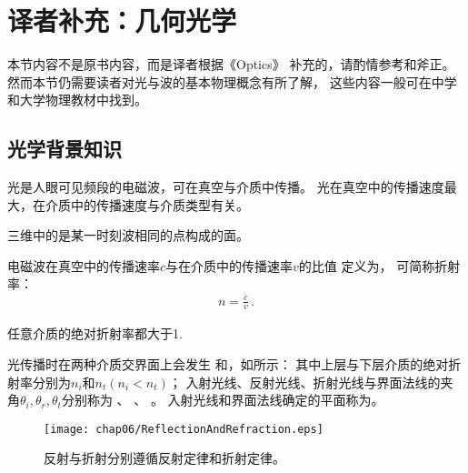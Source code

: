 \section{译者补充：几何光学}\label{sec:译者补充：几何光学}

\begin{remark}
    本节内容不是原书内容，而是译者根据《Optics》\citep{hecht2016optics}
    补充的，请酌情参考和斧正。然而本节仍需要读者对光与波的基本物理概念有所了解，
    这些内容一般可在中学和大学物理教材中找到。
\end{remark}

\subsection{光学背景知识}\label{sub:光学背景知识}
光是人眼可见频段的电磁波，可在真空与介质中传播。
光在真空中的传播速度最大，在介质中的传播速度与介质类型有关。
\begin{definition}
    三维中的是某一时刻波相同的点构成的面。
\end{definition}
\begin{definition}
    电磁波在真空中的传播速率$c$与在介质中的传播速率$v$的比值
    定义为，
    可简称折射率：
    \begin{align}
        n=\frac{c}{v}\, .
    \end{align}
\end{definition}
\begin{corollary}
    任意介质的绝对折射率都大于1.
\end{corollary}

光传播时在两种介质交界面上会发生
和，如所示：
其中上层与下层介质的绝对折射率分别为$n_i$和$n_t (n_i<n_t)$；
入射光线、反射光线、折射光线与界面法线的夹角$\theta_i, \theta_r, \theta_t$分别称为
、
、
。
入射光线和界面法线确定的平面称为。
\begin{figure}[htbp]
    \centering\texttt{[image: chap06/ReflectionAndRefraction.eps]}
    \caption{反射与折射分别遵循反射定律和折射定律。}
    \label{fig:6.26}
\end{figure}

